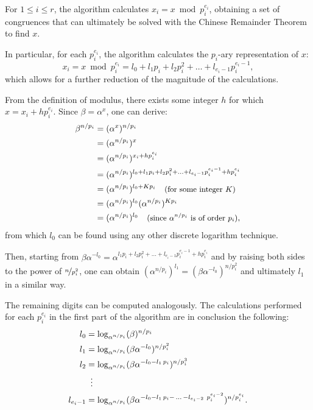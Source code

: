 \documentclass[UTF8]{article}
\begin{document}
For $1 \leq i \leq r$, the algorithm calculates $x_i = x \bmod{p_i^{e_i}}$, obtaining a set of congruences that can ultimately be solved with the Chinese Remainder Theorem to find $x$.

In particular, for each $p_i^{e_i}$, the algorithm calculates the $p_i$-ary representation of $x$:
$$x_i = x \bmod{p_i^{e_i}} = l_0 + l_1 p_i + l_2 p_i^2 + \ldots + l_{e_i - 1} p_i^{e_i - 1},$$
which allows for a further reduction of the magnitude of the calculations.

From the definition of modulus, there exists some integer $h$ for which $x=x_i+hp_i^{e_i}$. Since \mbox{$\beta=\alpha^x$}, one can derive:
\begin{align*}
    \beta^{n/p_i} & = (\alpha^x)^{n/p_i}                \\
                  & = (\alpha^{n/p_i})^x                \\
                  & = (\alpha^{n/p_i})^{x_i+hp_i^{e_i}} \\
                  & = (\alpha^{n/p_i})^{l_0 + l_1 p_i + l_2 p_i^2 + \ldots + l_{e_i - 1} p_i^{e_i - 1}+hp_i^{e_i}} \\
                  & = (\alpha^{n/p_i})^{l_0 + K p_i} \quad \text{\small{(for some integer $K$)}}  \\
                  & = (\alpha^{n/p_i})^{l_0} (\alpha^{n/p_i})^{K p_i} \\
                  & = (\alpha^{n/p_i})^{l_0} \quad \text{\small{(since $\alpha^{n/p_i}$ is of order $p_i$)}},
\end{align*}
from which $l_0$ can be found using any other discrete logarithm technique.

Then, starting from $\beta\alpha^{-l_0} = \alpha^{l_1 p_i + l_2 p_i^2 + \ldots + l_{e_i - 1} p_i^{e_i - 1}+hp_i^{e_i}}$ and by raising both sides to the power of $\nicefrac{n}{p_i^2}$, one can obtain $(\alpha^{n/p_i})^{l_1}=(\beta\alpha^{-l_0})^{n/p_i^2}$ and ultimately $l_1$ in a similar way.

The remaining digits can be computed analogously. The calculations performed for each $p_i^{e_i}$ in the first part of the algorithm are in conclusion the following:
\begin{align*}
    l_0         &              = \log_{\alpha^{n / p_i}}(\beta)^{n / p_i}                              \\
    l_1         &              = \log_{\alpha^{n / p_i}}(\beta\alpha^{-l_0})^{n / p_i^2}               \\
    l_2         &              = \log_{\alpha^{n / p_i}}(\beta\alpha^{-l_0 - l_1 \, p_i})^{n / p_i^3}  \\
                & \vdotswithin{=}                                                                      \\
    l_{e_i - 1} &              = \log_{\alpha^{n / p_i}}(\beta\alpha^{-l_0 - l_1 \, p_i - \, \ldots \, - l_{e_i - 2} \ p_i^{e_i - 2}})^{n / p_i^{e_i}}.
\end{align*}
\end{document}
